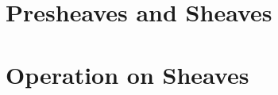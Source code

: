 \documentclass{article}
\begin{document}

\tableofcontents  
\clearpage

\section{Presheaves and Sheaves}

\section{Operation on Sheaves}
\end{document}
